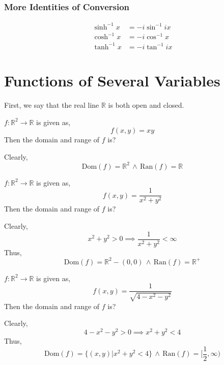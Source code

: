 \subsection{More Identities of Conversion}
\[\begin{split}
	\sinh^{-1}x&=-i\sin^{-1}ix\\
	\cosh^{-1}x&=-i\cos^{-1}x\\
	\tanh^{-1}x&=-i\tan^{-1}ix
\end{split}\]
\chapter{Functions of Several Variables}
First, we say that the real line $\mathbb{R}$ is both open and closed.
\begin{eg}
	$f:\mathbb{R}^2\to\mathbb{R}$ is given as,
	\[f(x,y)=xy\]
	Then the domain and range of $f$ is?
\end{eg}
\begin{explanation}
	Clearly,
	\[\text{Dom}(f)=\mathbb{R}^2\,\land \, \text{Ran}(f)=\mathbb{R}\]
\end{explanation}
\begin{eg}
	$f:\mathbb{R}^2\to\mathbb{R}$ is given as,
	\[f(x,y)=\frac{1}{x^2+y^2}\]
	Then the domain and range of $f$ is?
\end{eg}
\begin{explanation}
	Clearly,
	\[x^2+y^2>0\implies \frac{1}{x^2+y^2}<\infty\]
	Thus,
	\[\text{Dom}(f)=\mathbb{R}^2-{(0,0)}\,\land \, \text{Ran}(f)=\mathbb{R}^+\]
\end{explanation}
\begin{eg}
	$f:\mathbb{R}^2\to\mathbb{R}$ is given as,
	\[f(x,y)=\frac{1}{\sqrt{4-x^2-y^2}}\]
	Then the domain and range of $f$ is?
\end{eg}
\begin{explanation}
	Clearly,
	\[4-x^2-y^2>0\implies x^2+y^2<4\]
	Thus,
	\[\text{Dom}(f)=\{(x,y)| x^2+y^2<4\} \, \land \, \text{Ran}(f)=[\frac{1}{2},\infty)\]
\end{explanation}
